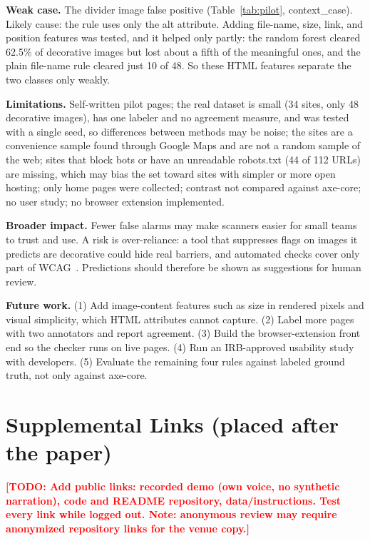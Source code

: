 \documentclass[sigconf,anonymous]{acmart}
\newcommand{\todo}[1]{\textcolor{red}{\textbf{[TODO: #1]}}}
\begin{document}
\textbf{Weak case.} The divider image false positive (Table~\ref{tab:pilot}, context\_case). Likely cause: the rule uses only the alt attribute. Adding file-name, size, link, and position features was tested, and it helped only partly: the random forest cleared 62.5\% of decorative images but lost about a fifth of the meaningful ones, and the plain file-name rule cleared just 10 of 48. So these HTML features separate the two classes only weakly.

\textbf{Limitations.} Self-written pilot pages; the real dataset is small (34 sites, only 48 decorative images), has one labeler and no agreement measure, and was tested with a single seed, so differences between methods may be noise; the sites are a convenience sample found through Google Maps and are not a random sample of the web; sites that block bots or have an unreadable robots.txt (44 of 112 URLs) are missing, which may bias the set toward sites with simpler or more open hosting; only home pages were collected; contrast not compared against axe-core; no user study; no browser extension implemented.

\textbf{Broader impact.} Fewer false alarms may make scanners easier for small teams to trust and use. A risk is over-reliance: a tool that suppresses flags on images it predicts are decorative could hide real barriers, and automated checks cover only part of WCAG~\cite{webaim2026,lempola2024}. Predictions should therefore be shown as suggestions for human review.

\textbf{Future work.} (1) Add image-content features such as size in rendered pixels and visual simplicity, which HTML attributes cannot capture. (2) Label more pages with two annotators and report agreement. (3) Build the browser-extension front end so the checker runs on live pages. (4) Run an IRB-approved usability study with developers. (5) Evaluate the remaining four rules against labeled ground truth, not only against axe-core.

\section*{Supplemental Links (placed after the paper)}
\todo{Add public links: recorded demo (own voice, no synthetic narration), code and README repository, data/instructions. Test every link while logged out. Note: anonymous review may require anonymized repository links for the venue copy.}



\end{document}
